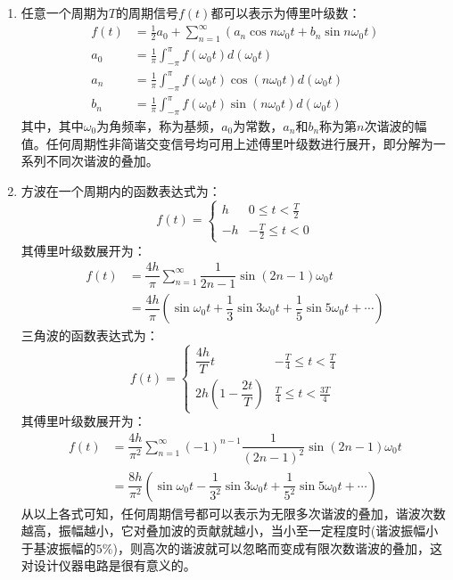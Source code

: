 \documentclass[11pt]{article}
\begin{document}
\begin{enumerate}
    \item 任意一个周期为$T$的周期信号$f(t)$都可以表示为傅里叶级数：
    \begin{align*}
        f(t) &= \frac{1}{2}a_0 + \sum_{n=1}^{\infty}(a_n \cos n\omega_0 t + b_n \sin n\omega_0 t)\\
        a_0 &= \frac{1}{\pi}\int_{-\pi}^{\pi}f(\omega_0t)d(\omega_0t)\\
        a_n &= \frac{1}{\pi}\int_{-\pi}^{\pi}f(\omega_0t)\cos(n\omega_0t)d(\omega_0t)\\
        b_n &= \frac{1}{\pi}\int_{-\pi}^{\pi}f(\omega_0t)\sin(n\omega_0t)d(\omega_0t)
    \end{align*}
    其中，其中$\omega_0$为角频率，称为基频，$a_0$为常数，$a_n$和$b_n$称为第$n$次谐波的幅值。任何周期性非简谐交变信号均可用上述傅里叶级数进行展开，即分解为一系列不同次谐波的叠加。
    \item 方波在一个周期内的函数表达式为：
    $$
    f(t)=\left\{
        \begin{array}{cc}
        h & 0\leq t<\frac{T}{2} \\
        -h & -\frac{T}{2}\leq t<0
        \end{array}
        \right.
    $$
    其傅里叶级数展开为：
    \begin{align*}
        f(t)&=\dfrac{4h}{\pi}\sum_{n=1}^{\infty}\dfrac{1}{2n-1}\sin(2n-1)\omega_0t\\
        &=\dfrac{4h}{\pi}\left(\sin\omega_0t+\dfrac{1}{3}\sin3\omega_0t+\dfrac{1}{5}\sin5\omega_0t+\cdots\right)
    \end{align*}
    三角波的函数表达式为：
    $$
    f(t)=\left\{
        \begin{array}{cc}
        \dfrac{4h}{T}t & -\frac{T}{4}\leq t<\frac{T}{4} \\
        2h(1-\dfrac{2t}{T}) & \frac{T}{4}\leq t<\frac{3T}{4}
        \end{array}
        \right.
    $$
    其傅里叶级数展开为：
    \begin{align*}
        f(t)&=\dfrac{4h}{\pi^2}\sum_{n=1}^{\infty}(-1)^{n-1}\dfrac{1}{(2n-1)^2}\sin(2n-1)\omega_0t\\
        &=\dfrac{8h}{\pi^2}\left(\sin\omega_0t-\dfrac{1}{3^2}\sin3\omega_0t+\dfrac{1}{5^2}\sin5\omega_0t+\cdots\right)
    \end{align*}
    从以上各式可知，任何周期信号都可以表示为无限多次谐波的叠加，谐波次数越高，振幅越小，它对叠加波的贡献就越小，当小至一定程度时(谐波振幅小于基波振幅的$5\%$)，则高次的谐波就可以忽略而变成有限次数谐波的叠加，这对设计仪器电路是很有意义的。
\end{enumerate}
\end{document}
